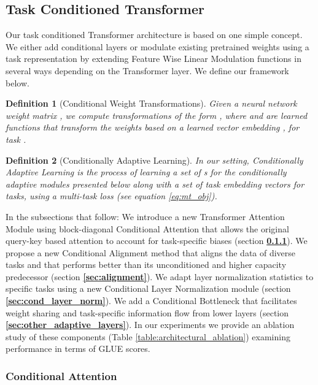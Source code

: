 \documentclass{article} \usepackage{iclr2021_conference,times}
\newtheorem{definition}{Definition}
\begin{document}
\subsection{Task Conditioned Transformer}
\label{sec:conditional_transformer}
Our task conditioned Transformer architecture is based on one simple concept. We either add conditional layers or modulate existing pretrained weights using a task representation by extending Feature Wise Linear Modulation \citep{Perez2018FiLMVR} functions in several ways depending on the Transformer layer. We define our framework below.
\begin{definition}[Conditional Weight Transformations]
Given a neural network weight matrix , we compute transformations of the form , where  and  are learned functions that transform the weights based on a learned vector embedding , for task . 
\end{definition}
\begin{definition}[Conditionally Adaptive Learning]
In our setting, Conditionally Adaptive Learning is the process of learning a set of s for the conditionally adaptive modules presented below along with a set of task embedding vectors  for  tasks, using a 
multi-task loss (see equation \ref{eq:mt_obj}).
\end{definition}
In the subsections that follow:
We introduce a new Transformer Attention Module using block-diagonal Conditional Attention that allows the original query-key based attention to account for task-specific biases (section \textbf{\ref{sec:cond_attn_mat}}). We propose a new Conditional Alignment method that aligns the data of diverse tasks and that performs better than its unconditioned and higher capacity predecessor (section \textbf{\ref{sec:alignment}}). We adapt layer normalization statistics to specific tasks using a new Conditional Layer Normalization module (section \textbf{\ref{sec:cond_layer_norm}}). We add a Conditional Bottleneck that facilitates  weight sharing and task-specific information flow from lower layers (section \textbf{\ref{sec:other_adaptive_layers}}). In our experiments we provide an ablation study of these components (Table \ref{table:architectural_ablation}) examining performance in terms of GLUE scores.




\subsubsection{Conditional Attention}
\label{sec:cond_attn_mat}
\end{document}
